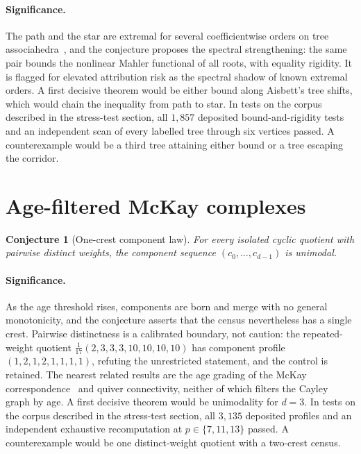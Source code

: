 \documentclass[11pt]{article}
\newtheorem{conjecture}{Conjecture}
\theoremstyle{definition}
\begin{document}
\paragraph{Significance.}
The path and the star are extremal for several coefficientwise orders on tree associahedra~\cite{BV10,Ais12}, and the conjecture proposes the spectral strengthening: the same pair bounds the nonlinear Mahler functional of all roots, with equality rigidity.  It is flagged for elevated attribution risk as the spectral shadow of known extremal orders.  A first decisive theorem would be either bound along Aisbett's tree shifts, which would chain the inequality from path to star.  In tests on the corpus described in the stress-test section, all $1{,}857$ deposited bound-and-rigidity tests and an independent scan of every labelled tree through six vertices passed.  A counterexample would be a third tree attaining either bound or a tree escaping the corridor.

\section{Age-filtered McKay complexes}

\begin{conjecture}[One-crest component law]\label{z6}
For every isolated cyclic quotient with pairwise distinct weights, the component sequence $(c_0,\ldots,c_{d-1})$ is unimodal.
\end{conjecture}

\paragraph{Significance.}
As the age threshold rises, components are born and merge with no general monotonicity, and the conjecture asserts that the census nevertheless has a single crest.  Pairwise distinctness is a calibrated boundary, not caution: the repeated-weight quotient $\tfrac1{17}(2,3,3,3,10,10,10,10)$ has component profile $(1,2,1,2,1,1,1,1)$, refuting the unrestricted statement, and the control is retained.  The nearest related results are the age grading of the McKay correspondence~\cite{Reid02} and quiver connectivity, neither of which filters the Cayley graph by age.  A first decisive theorem would be unimodality for $d=3$.  In tests on the corpus described in the stress-test section, all $3{,}135$ deposited profiles and an independent exhaustive recomputation at $p\in\{7,11,13\}$ passed.  A counterexample would be one distinct-weight quotient with a two-crest census.
\end{document}
